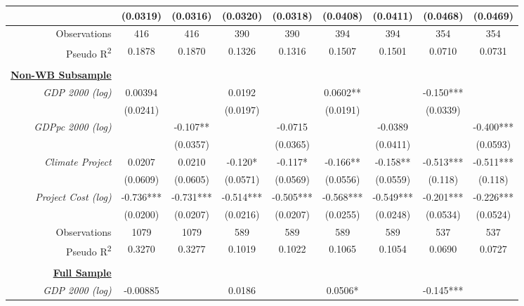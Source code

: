 \documentclass{article}
\begin{document}
\begin{singlespace}
\begin{table}[H]
{\begin{tabular}{rcccccccc}
				\textit{} & (0.0319) & (0.0316) & (0.0320) & (0.0318) & (0.0408) & (0.0411) & (0.0468) & (0.0469) \\ \hline
				Observations & 416 & 416 & 390 & 390 & 394 & 394 & 354 & 354 \\
				Pseudo R\textsuperscript{2} & 0.1878 & 0.1870 & 0.1326 & 0.1316 & 0.1507 & 0.1501 & 0.0710 & 0.0731 \\ \hline
				\multicolumn{1}{l}{} & \multicolumn{1}{l}{} & \multicolumn{1}{l}{} & \multicolumn{1}{l}{} & \multicolumn{1}{l}{} & \multicolumn{1}{l}{} & \multicolumn{1}{l}{} & \multicolumn{1}{l}{} & \multicolumn{1}{l}{} \\
				{\ul \textbf{Non-WB Subsample}} &  &  &  &  &  &  &  &  \\
				\textit{GDP 2000 (log)} & 0.00394 &  & 0.0192 &  & 0.0602** &  & -0.150*** &  \\
				\textit{} & (0.0241) &  & (0.0197) &  & (0.0191) &  & (0.0339) &  \\
				\textit{GDPpc 2000 (log)} &  & -0.107** &  & -0.0715 &  & -0.0389 &  & -0.400*** \\
				\textit{} &  & (0.0357) &  & (0.0365) &  & (0.0411) &  & (0.0593) \\
				\textit{Climate Project} & 0.0207 & 0.0210 & -0.120* & -0.117* & -0.166** & -0.158** & -0.513*** & -0.511*** \\
				\textit{} & (0.0609) & (0.0605) & (0.0571) & (0.0569) & (0.0556) & (0.0559) & (0.118) & (0.118) \\
				\textit{Project Cost (log)} & -0.736*** & -0.731*** & -0.514*** & -0.505*** & -0.568*** & -0.549*** & -0.201*** & -0.226*** \\
				\textit{} & (0.0200) & (0.0207) & (0.0216) & (0.0207) & (0.0255) & (0.0248) & (0.0534) & (0.0524) \\ \hline
				Observations & 1079 & 1079 & 589 & 589 & 589 & 589 & 537 & 537 \\
				Pseudo R\textsuperscript{2} & 0.3270 & 0.3277 & 0.1019 & 0.1022 & 0.1065 & 0.1054 & 0.0690 & 0.0727 \\ \hline
				\multicolumn{1}{l}{} & \multicolumn{1}{l}{} & \multicolumn{1}{l}{} & \multicolumn{1}{l}{} & \multicolumn{1}{l}{} & \multicolumn{1}{l}{} & \multicolumn{1}{l}{} & \multicolumn{1}{l}{} & \multicolumn{1}{l}{} \\
				{\ul \textbf{Full Sample}} &  &  &  &  &  &  &  &  \\
				\textit{GDP 2000 (log)} & -0.00885 &  & 0.0186 &  & 0.0506* &  & -0.145*** &  \\

\end{tabular}}
\end{table}
\end{singlespace}
\end{document}
